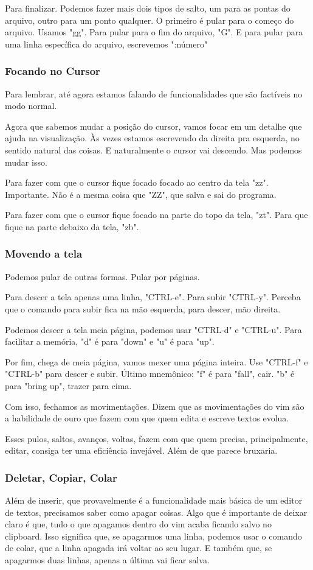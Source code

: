 \documentclass[a4paper, 12pt]{article}
\begin{document}
Para finalizar.
Podemos fazer mais dois tipos de salto, um para as pontas do arquivo, outro para um ponto qualquer.
O primeiro é pular para o começo do arquivo.
Usamos "gg".
Para pular para o fim do arquivo, "G".
E para pular para uma linha específica do arquivo, escrevemos ":número"

\subsubsection{Focando no Cursor}
Para lembrar, até agora estamos falando de funcionalidades que são factíveis no modo normal.

Agora que sabemos mudar a posição do cursor, vamos focar em um detalhe que ajuda na visualização.
Às vezes estamos escrevendo da direita pra esquerda, no sentido natural das coisas.
E naturalmente o cursor vai descendo.
Mas podemos mudar isso.

Para fazer com que o cursor fique focado focado ao centro da tela "zz".
Importante. Não é a mesma coisa que "ZZ", que salva e sai do programa.

Para fazer com que o cursor fique focado na parte do topo da tela, "zt".
Para que fique na parte debaixo da tela, "zb".

\subsubsection{Movendo a tela}
Podemos pular de outras formas. Pular por páginas.

Para descer a tela apenas uma linha, "CTRL-e". Para subir "CTRL-y".
Perceba que o comando para subir fica na mão esquerda, para descer, mão direita.

Podemos descer a tela meia página, podemos usar "CTRL-d" e "CTRL-u".
Para facilitar a memória, "d" é para "down" e "u" é para "up".

Por fim, chega de meia página, vamos mexer uma página inteira.
Use "CTRL-f" e "CTRL-b" para descer e subir.
Último mnemônico: "f" é para "fall", cair.
"b" é para "bring up", trazer para cima.

Com isso, fechamos as movimentações.
Dizem que as movimentações do vim são a habilidade de ouro que fazem com que quem edita e escreve textos evolua.

Esses pulos, saltos, avanços, voltas, fazem com que quem precisa, principalmente, editar, consiga ter uma eficiência invejável.
Além de que parece bruxaria.

\subsubsection{Deletar, Copiar, Colar}
Além de inserir, que provavelmente é a funcionalidade mais básica de um editor de textos, precisamos saber como apagar coisas.
Algo que é importante de deixar claro é que, tudo o que apagamos dentro do vim acaba ficando salvo no clipboard.
Isso significa que, se apagarmos uma linha, podemos usar o comando de colar, que a linha apagada irá voltar ao seu lugar.
E também que, se apagarmos duas linhas, apenas a última vai ficar salva.
\end{document}
